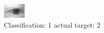 \begin{figure}[h!]
\begin{center}
\includegraphics[width=0.60\columnwidth]{figures/ID428_class_1_target_2.png}
\end{center}
\caption{ Classification: 1 actual target: 2}
\label{fig:ID428_class_1_target_2}
\end{figure}
